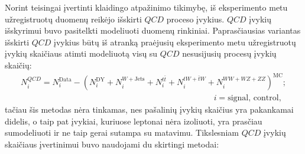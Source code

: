 \documentclass[a4paper, 12pt, oneside]{article}
\newcommand{\ZZ}{Z\! Z}
\newcommand{\WZ}{W\! Z}
\newcommand{\tbarW}{\bar{t}W}
\newcommand{\ttbar}{t\bar{t}}
\newcommand{\WJets}{W\! +\!\mathrm{Jets}}
\newcommand{\QCD}{QC\! D}
\newlength\q
\begin{document}
Norint teisingai įvertinti klaidingo atpažinimo tikimybę, iš eksperimento metu užregistruotų duomenų reikėjo išskirti $\QCD$
proceso įvykius.
$\QCD$ įvykių išskyrimui buvo pasitelkti modeliuoti duomenų rinkiniai.
Paprasčiausias variantas išskirti $\QCD$ įvykius būtų iš atranką praėjusių eksperimento metu užregistruotų įvykių skaičiaus
atimti modeliuotą visų su $\QCD$ nesusijusių procesų įvykių skaičių:
\begin{equation}
	\begin{gathered}
		N^{\QCD}_{i} = N^{\mathrm{Data}}_{i} - \left( N^{\mathrm{DY}}_{i} +
		N^{\WJets}_{i} + N^{\ttbar}_{i} + N^{tW+\tbarW}_{i} +
		N^{WW+\WZ+\ZZ}_{i} \right)^{\mathrm{MC}}; \\
		\hspace{280pt} i = \mathrm{signal}, \, \mathrm{control},
	\end{gathered}
\end{equation}
tačiau šis metodas nėra tinkamas, nes pašalinių įvykių skaičius yra pakankamai didelis, o taip pat įvykiai, kuriuose leptonai
nėra izoliuoti, yra prasčiau sumodeliuoti ir ne taip gerai sutampa su matavimu.
Tikslesniam $\QCD$ įvykių skaičiaus įvertinimui buvo naudojami du skirtingi metodai:
\end{document}
